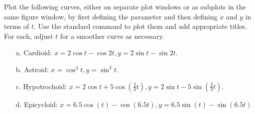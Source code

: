 {Plot the following curves, either on separate plot windows or as subplots in the same figure window, by first defining the parameter  and then defining $x$ and $y$ in terms of $t$.  Use the standard  command to plot them and add appropriate titles.  For each, adjust $t$ for a smoother curve as necessary.
\begin{enumerate}
\item[a.] Cardioid: $x = 2 \cos t - \cos 2t, y = 2\sin t - \sin 2t$.
\item[b.] Astroid: $x = \cos^3 t, y = \sin^3 t$.
\item[c.] Hypotrochoid: $x = 2 \cos t + 5\cos\left(\frac{2}{3}t\right), y = 2\sin t - 5\sin\left(\frac{2}{3}t\right)$.
\item[d.] Epicycloid: $x=6.5 \cos(t)-\cos(6.5 t), y=6.5 \sin(t)-\sin(6.5 t)$
\end{enumerate} 
}
{}
